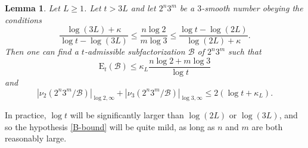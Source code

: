\documentclass[12pt,a4paper,reqno]{amsart}
\numberwithin{equation}{section}
\theoremstyle{plain}
\newtheorem{lemma}[theorem]{Lemma}
\theoremstyle{definition}
\newcommand\tuple{{\mathcal B}}
\newcommand\excess{{\mathrm{E}}}
\begin{document}
\begin{lemma}\label{bound23}  Let $L \geq 1$.  Let $t > 3L$ and let $2^n 3^m$ be a $3$-smooth number obeying the conditions
\begin{equation}\label{B-bound}
\frac{\log(3L)+\kappa}{\log t - \log(3L)} \leq \frac{n \log 2}{m \log 3} \leq \frac{\log t - \log(2L)}{\log(2L)+\kappa}.
\end{equation}
Then one can find a $t$-admissible subfactorization $\tuple$ of $2^n 3^m$ such that
\begin{equation}\label{excess-bound} 
  \excess_t(\tuple) \leq \kappa_L \frac{n \log 2 + m \log 3}{\log t} 
\end{equation}
and
\begin{equation}\label{surplus-bound} 
  |\nu_2(2^n 3^m/\tuple)|_{\log 2,\infty} + |\nu_3(2^n 3^m/\tuple)|_{\log 3,\infty}  \leq 2(\log t + \kappa_L).
\end{equation}
\end{lemma}

In practice, $\log t$ will be significantly larger than $\log(2L)$ or $\log(3L)$, and so the hypothesis \eqref{B-bound} will be quite mild, as long as $n$ and $m$ are both reasonably large.
\end{document}
